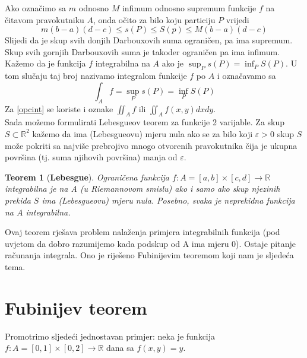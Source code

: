 \documentclass[a4paper, 11pt]{article}
\theoremstyle{plain}
\theoremstyle{plain}
\newtheorem{theorem}[definition]{Teorem}
\theoremstyle{definition}
\theoremstyle{remark}
\begin{document}
Ako označimo sa $m$ odnosno $M$ infimum odnosno supremum funkcije $f$ na čitavom pravokutniku $A$,
onda očito za bilo koju particiju $P$ vrijedi
    $$
        m(b-a)(d-c) \leq s(P) \leq S(p) \leq M(b-a)(d-c)
    $$
\noindent
Slijedi da je skup svih donjih Darbouxovih suma ograničen, pa ima supremum. Skup svih gornjih
Darbouxovih suma je takoder ograničen pa ima infimum. Kažemo da je funkcija $f$ integrabilna
na $A$ ako je $\sup_P s(P) = \inf_P S(P)$. U tom slučaju taj broj nazivamo integralom funkcije $f$ po
$A$ i označavamo sa
    \begin{equation}\label{opcint}
        \int_A f= \sup_P s(P) = \inf_P S(P)
    \end{equation}
\noindent
Za \eqref{opcint} se koriste i oznake $\iint_A f$ ili $\iint_A f(x,y) dxdy$.\\
Sada možemo formulirati Lebesgueov teorem za funkcije 2 varijable. Za skup $S \subset \mathbb{R}^2$ kažemo da ima (Lebesgueovu) mjeru nula ako se za bilo koji $\varepsilon > 0$ skup $S$ može pokriti sa najviše prebrojivo mnogo otvorenih pravokutnika čija je ukupna površina (tj. suma njihovih površina) manja od $\varepsilon$.

    \begin{theorem}[\bf Lebesgue]
        Ograničena funkcija $f : A = [a,b] \times [c,d] \to \mathbb{R}$ integrabilna je na A
    (u Riemannovom smislu) ako i samo ako skup njezinih prekida $S$ ima (Lebesgueovu) mjeru nula.
    Posebno, svaka je neprekidna funkcija na $A$ integrabilna.

    \end{theorem}

Ovaj teorem rješava problem nalaženja primjera integrabilnih funkcija (pod uvjetom da dobro
razumijemo kada podskup od A ima mjeru 0). Ostaje pitanje računanja integrala. Ono je riješeno Fubinijevim teoremom koji nam je sljedeća tema.
    

\section{Fubinijev teorem}

Promotrimo sljedeći jednostavan primjer: neka je funkcija $f : A = [0, 1] \times [0, 2] \to \mathbb{R}$ dana sa
$f(x, y) = y$.\\
\end{document}
